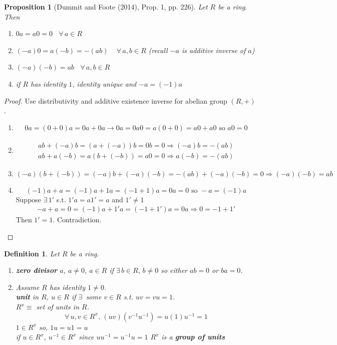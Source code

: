 \documentclass[10pt]{amsart}
\newtheorem{proposition}{Proposition}
\newtheorem{definition}{Definition}
\begin{document}
\begin{multicols*}{2}
\begin{proposition}[Dummit and Foote (2014)\cite{DuFo2003}, Prop. 1, pp. 226]
Let $R$ be a ring. \\
Then
\begin{enumerate}
	\item $0a = a0 = 0$ \, $\forall \, a \in R$ 
	\item $(-a) 0 = a(-b) = -(ab) \quad \, \forall \, a,b \in R$ (recall $-a$ is additive inverse of $a$)
	\item $(-a)(-b) =ab$ \quad \, $\forall \, a, b \in R$ 
	\item if $R$ has identity $1$, identity unique and $-a = (-1) a$
\end{enumerate}
\end{proposition}

\begin{proof}
Use distributivity and additive existence inverse for abelian group $(R, +)$. 

\begin{enumerate}
	\item \[
	\begin{gathered}
	0a = (0 + 0) a = 0a + 0a \to 0a = 0 
	a0 = a(0 + 0) = a0 + a0 \text{ so } a0 = 0 	
	\end{gathered}
	\]
	\item 
	\[
	\begin{gathered} 
	ab + (-a)b = (a + (-a)) b = 0b = 0 \Longrightarrow (-a) b = -(ab) \\
	ab + a(-b) = a(b + (-b)) = a0 = 0 \Longrightarrow a(-b) = -(ab) 	
	\end{gathered} 
	\]
	\item \[
	(-a)(b + (-b)) = (-a)b + (-a)(-b) = -(ab) + (-a)(-b) = 0 \Longrightarrow (-a)(-b) =ab
	\]
	\item \[
	(-1)a  + a = (-1) a + 1a = (-1 + 1) a = 0a = 0 \text{ so } -a = (-1) a
	\]
	Suppose $\exists \, 1'$ s.t. $1' a = a1' = a$ and $1' \neq 1$  
	\[
	\begin{gathered}
	-a + a = 0 = (-1) a + 1' a = (-1 + 1') a = 0 a \Longrightarrow 0 = -1 + 1' 
	\end{gathered}
	\]
	Then $1' = 1$. Contradiction. 
\end{enumerate}
\end{proof}

\begin{definition}
Let $R$ be a ring.
\begin{enumerate}
	\item \textbf{zero divisor} $a$, $a\neq 0$, $a\in R$ if $\exists \,  b\in R, \, b\neq 0$ so either $ab= 0$ or $ba=0$. 
	\item Assume $R$ has identity $1\neq 0$. \\
	\textbf{unit} in $R$, $u\in R$ if $\exists \,$ some $v\in R$ s.t. $uv = vu =1$. \\
	$R^x \equiv $ set of units in $R$. 
	\[
	\forall \, u,v \in R^x, \, (uv) (v^{-1}u^{-1}) = u(1)u^{-1} = 1
	\]
	$1 \in R^x$ so, $1u = u1 = u$ \\
	if $u\in R^x$, $u^{-1} \in R^x$ since $uu^{-1} = u^{-1} u =1$ 
$R^x$ is a \textbf{group of units}
\end{enumerate}	
\end{definition} 


\end{multicols*}
\end{document}
